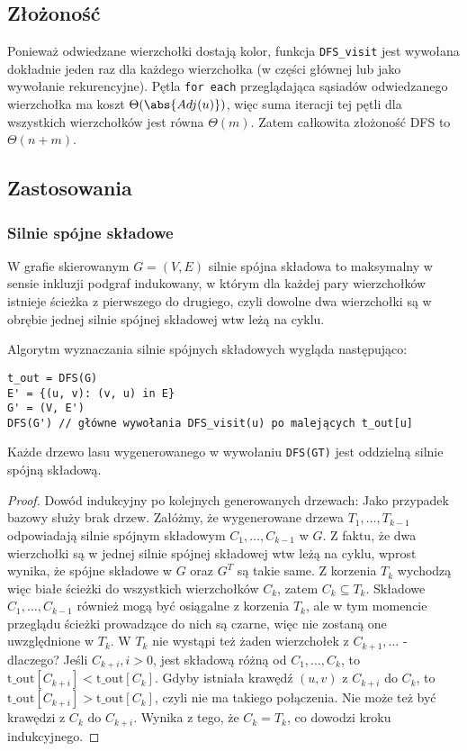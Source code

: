 \subsection{Złożoność}
Ponieważ odwiedzane wierzchołki dostają kolor, funkcja \texttt{DFS\_visit} jest wywołana dokładnie jeden raz dla każdego wierzchołka (w części głównej lub jako wywołanie rekurencyjne).
Pętla \texttt{for each} przeglądająca sąsiadów odwiedzanego wierzchołka ma koszt \( \Theta(\abs{Adj(u)}) \), więc suma iteracji tej pętli dla wszystkich wierzchołków jest równa \( \Theta(m) \).
Zatem całkowita złożoność DFS to \( \Theta(n + m) \).

\subsection{Zastosowania}
\subsubsection{Silnie spójne składowe}
W grafie skierowanym \( G=(V,E) \) silnie spójna składowa to maksymalny w sensie inkluzji podgraf indukowany,
w którym dla każdej pary wierzchołków istnieje ścieżka z pierwszego do drugiego, czyli dowolne dwa wierzchołki są w obrębie jednej silnie spójnej składowej wtw leżą na cyklu.

Algorytm wyznaczania silnie spójnych składowych wygląda następująco:
\begin{verbatim}
t_out = DFS(G)
E' = {(u, v): (v, u) in E}
G' = (V, E')
DFS(G') // główne wywołania DFS_visit(u) po malejących t_out[u]
\end{verbatim}
Każde drzewo lasu wygenerowanego w wywołaniu \texttt{DFS(GT)} jest oddzielną silnie spójną składową.
\begin{proof}
    Dowód indukcyjny po kolejnych generowanych drzewach:
    Jako przypadek bazowy służy brak drzew. Załóżmy, że wygenerowane drzewa \( T_1, \dots, T_{k-1} \) odpowiadają silnie spójnym składowym \( C_1, \dots, C_{k-1} \) w \( G \).
    Z faktu, że dwa wierzchołki są w jednej silnie spójnej składowej wtw leżą na cyklu, wprost wynika, że spójne składowe w \( G \) oraz \( G^T \) są takie same.
    Z korzenia \( T_k \) wychodzą więc białe ścieżki do wszystkich wierzchołków \( C_k \), zatem \( C_k \subseteq T_k \).
    Składowe \( C_1, \dots, C_{k-1} \) również mogą być osiągalne z korzenia \( T_k \), ale w tym momencie przeglądu ścieżki prowadzące do nich są czarne, więc nie zostaną one uwzględnione w  \( T_k \).
    W \( T_k \) nie wystąpi też żaden wierzchołek z \( C_{k+1}, \dots \) - dlaczego? Jeśli \( C_{k+i}, i > 0 \), jest składową różną od \( C_1, \dots, C_k \), to \( \text{t\_out}[C_{k+i}] < \text{t\_out}[C_k] \).
    Gdyby istniała krawędź \( (u, v) \) z \( C_{k+i} \) do \( C_k \), to \( \text{t\_out}[C_{k+i}] > \text{t\_out}[C_k] \), czyli nie ma takiego połączenia. Nie może też być krawędzi z \( C_k \) do \( C_{k+i} \).
    Wynika z tego, że \( C_k = T_k \), co dowodzi kroku indukcyjnego.
\end{proof}

